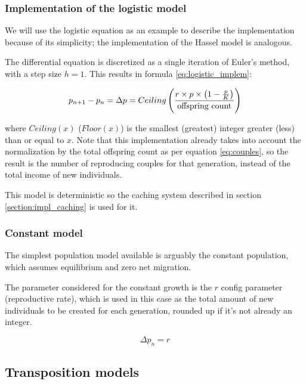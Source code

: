 \documentclass[10pt]{article}
\begin{document}
\subsubsection{Implementation of the logistic model}

We will use the logistic equation as an example to describe the
implementation because of its simplicity; the implementation of the
Hassel model is analogous.

The differential equation is discretized as a single iteration of
Euler's method, with a step size $h=1$. This results in formula
\eqref{eq:logistic_implem}:

\begin{equation}
  \label{eq:logistic_implem}
  p_{n+1} - p_n = \Delta p = Ceiling \left(  
  \frac{r \times p \times \left(1-\frac{p}{K}\right)}
       {\hbox{offspring count}}  
       \right)
\end{equation}

where $Ceiling(x)$ ($Floor(x)$) is the smallest (greatest) integer
greater (less) than or equal to $x$. Note that this implementation
already takes into account the normalization by the total offspring
count as per equation \eqref{eq:couples}, so the result is the number
of reproducing couples for that generation, instead of the total
income of new individuals.

This model is deterministic so the caching system described in section
\ref{section:impl_caching} is used for it.

\subsubsection{Constant model}

The simplest population model available is arguably the constant
population, which assumes equilibrium and zero net migration. 

The parameter considered for the constant growth is the $r$ config
parameter (reproductive rate), which is used in this case as the total
amount of new individuals to be created for each generation, rounded
up if it's not already an integer.

\begin{equation}
  \Delta p_n = r
\end{equation}


\subsection{Transposition models}
\label{sec:impl_transp_models}
\end{document}
